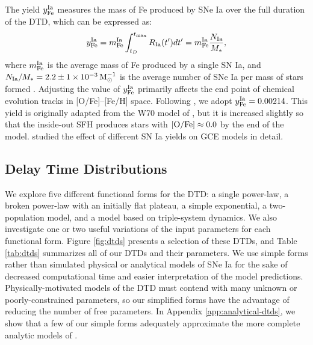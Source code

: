 \documentclass[twocolumn,twocolappendix,linenumbers,trackchanges]{aastex631}
\begin{document}
The yield $y_{\rm Fe}^{\rm Ia}$ measures the mass of Fe produced by SNe Ia over the full duration of the DTD, which can be expressed as:
\begin{equation}
    y_{\rm Fe}^{\rm Ia} = m_{\rm Fe}^{\rm Ia} \int_{t_D}^{t_{\rm max}} R_{\rm Ia}(t')dt' = m_{\rm Fe}^{\rm Ia} \frac{N_{\rm Ia}}{M_*},
    \label{eq:dtd-integral}
\end{equation}
where $m_{\rm Fe}^{\rm Ia}$ is the average mass of Fe produced by a single SN Ia, and $N_{\rm Ia}/M_*=2.2\pm1\times10^{-3}\,{\rm M}_\odot^{-1}$ is the average number of SNe Ia per mass of stars formed \citep{MaozMannucci2012-SNeIaReview}. 
Adjusting the value of $y_{\rm Fe}^{\rm Ia}$ primarily affects the end point of chemical evolution tracks in [O/Fe]--[Fe/H] space. 
Following , we adopt $y_{\rm Fe}^{\rm Ia}=0.00214$. This yield is originally adapted from the W70 model of \citet{Iwamoto1999-SNIaYields}, but it is increased slightly so that the inside-out SFH produces stars with ${\rm [O/Fe]}\approx 0.0$ by the end of the model.
\citet{Palla2021-SNIaYield} studied the effect of different SN Ia yields on GCE models in detail.

\subsection{Delay Time Distributions}
\label{sec:dtd-models}

We explore five different functional forms for the DTD: a single power-law, a broken power-law with an initially flat plateau, a simple exponential, a two-population model, and a model based on triple-system dynamics. We also investigate one or two useful variations of the input parameters for each functional form. Figure \ref{fig:dtds} presents a selection of these DTDs, and Table \ref{tab:dtds} summarizes all of our DTDs and their parameters. We use simple forms rather than simulated physical or analytical models of SNe Ia for the sake of decreased computational time and easier interpretation of the model predictions. Physically-motivated models of the DTD must contend with many unknown or poorly-constrained parameters, so our simplified forms have the advantage of reducing the number of free parameters. In Appendix \ref{app:analytical-dtds}, we show that a few of our simple forms adequately approximate the more complete analytic models of \citet{Greggio2005-AnalyticalRates}. 
\end{document}

